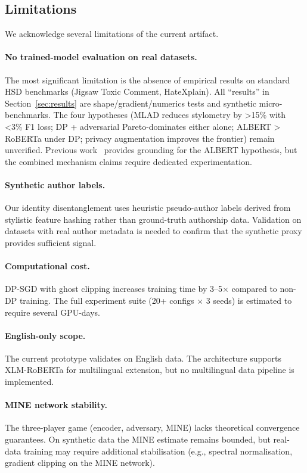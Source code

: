 \documentclass{article}
\begin{document}
\subsection{Limitations}
\label{sec:limitations}

We acknowledge several limitations of the current artifact.

\paragraph{No trained-model evaluation on real datasets.}
The most significant limitation is the absence of empirical results on
standard HSD benchmarks (Jigsaw Toxic Comment, HateXplain). All
``results'' in Section~\ref{sec:results} are shape/gradient/numerics
tests and synthetic micro-benchmarks. The four hypotheses
(MLAD reduces stylometry by >15\% with <3\% F1 loss; DP + adversarial
Pareto-dominates either alone; ALBERT > RoBERTa under DP; privacy
augmentation improves the frontier) remain unverified.
Previous work~\cite{biy2025privacy} provides grounding for the ALBERT
hypothesis, but the combined mechanism claims require dedicated
experimentation.

\paragraph{Synthetic author labels.}
Our identity disentanglement uses heuristic pseudo-author labels derived
from stylistic feature hashing rather than ground-truth authorship data.
Validation on datasets with real author metadata is needed to confirm
that the synthetic proxy provides sufficient signal.

\paragraph{Computational cost.}
DP-SGD with ghost clipping increases training time by 3--5$\times$
compared to non-DP training. The full experiment suite (20+ configs
$\times$ 3 seeds) is estimated to require several GPU-days.

\paragraph{English-only scope.}
The current prototype validates on English data. The architecture
supports XLM-RoBERTa for multilingual extension, but no multilingual
data pipeline is implemented.

\paragraph{MINE network stability.}
The three-player game (encoder, adversary, MINE) lacks theoretical
convergence guarantees. On synthetic data the MINE estimate remains
bounded, but real-data training may require additional stabilisation
(e.g., spectral normalisation, gradient clipping on the MINE network).
\end{document}
